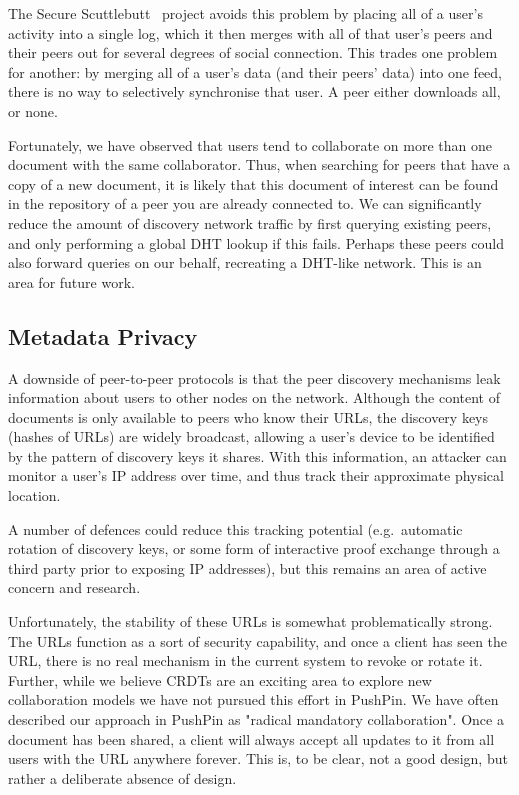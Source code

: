 \documentclass[sigplan,10pt]{acmart}
\begin{document}

The Secure Scuttlebutt~\cite{Tarr:2019ba} project avoids this problem by placing all of a user's activity into a single log, which it then merges with all of that user's peers and their peers out for several degrees of social connection. This trades one problem for another: by merging all of a user's data (and their peers' data) into one feed, there is no way to selectively synchronise that user. A peer either downloads all, or none.

Fortunately, we have observed that users tend to collaborate on more than one document with the same collaborator.
Thus, when searching for peers that have a copy of a new document, it is likely that this document of interest can be found in the repository of a peer you are already connected to.
We can significantly reduce the amount of discovery network traffic by first querying existing peers, and only performing a global DHT lookup if this fails.
Perhaps these peers could also forward queries on our behalf, recreating a DHT-like network.
This is an area for future work.

\subsection{Metadata Privacy}

A downside of peer-to-peer protocols is that the peer discovery mechanisms leak information about users to other nodes on the network.
Although the content of documents is only available to peers who know their URLs, the discovery keys (hashes of URLs) are widely broadcast, allowing a user's device to be identified by the pattern of discovery keys it shares.
With this information, an attacker can monitor a user's IP address over time, and thus track their approximate physical location.

A number of defences could reduce this tracking potential (e.g.\ automatic rotation of discovery keys, or some form of interactive proof exchange through a third party prior to exposing IP addresses), but this remains an area of active concern and research.


Unfortunately, the stability of these URLs is somewhat problematically strong. The URLs function as a sort of security capability, and once a client has seen the URL, there is no real mechanism in the current system to revoke or rotate it. Further, while we believe CRDTs are an exciting area to explore new collaboration models \cite{Pixelpusher} we have not pursued this effort in PushPin. We have often described our approach in PushPin as "radical mandatory collaboration". Once a document has been shared, a client will always accept all updates to it from all users with the URL anywhere forever. This is, to be clear, not a good design, but rather a deliberate absence of design. 
\end{document}
